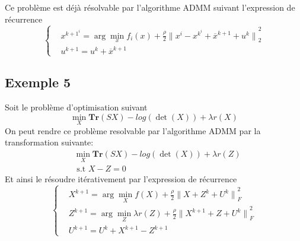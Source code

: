 \documentclass[12pt,a4paper]{report}
\begin{document}
            	Ce problème est déjà résolvable par l'algorithme ADMM suivant l'expression de récurrence
            	\begin{equation*}
                	\left\{  
                    	\begin{aligned}
                        	& x^{k+1}^i = \arg\min_{x} f_i(x) + \frac{\rho}{2}{\| x^i - x^k^i + \overline{x}^{k+1} + u^k\|}^2_2 \\
                        	& u^{k+1} = u^{k} + \overline{x}^{k+1}
                    	\end{aligned}
                	\right.
            	\end{equation*}
           	 
        	\subsection*{Exemple 5}
            	Soit le problème d'optimisation suivant
            	\begin{equation*}
                	\min_{X} \textbf{Tr}(SX) - log(\det(X)) + \lambda r(X)
            	\end{equation*}
            	On peut rendre ce problème resolvable par l'algorithme ADMM par la transformation suivante:
            	\begin{equation*}
                	\begin{aligned}
                    	& \min_{X} \textbf{Tr}(SX) - log(\det(X)) + \lambda r(Z) \\
                    	& \text{ s.t  $X - Z = 0$ }
                	\end{aligned}
            	\end{equation*}
            	Et ainsi le résoudre itérativement par l'expression de récurrence
            	\begin{equation*}
                	\left\{  
                    	\begin{aligned}
                        	& X^{k+1} = \arg\min_{X} f(X) + \frac{\rho}{2}{\| X + Z^k + U^k\|}^2_F \\
                        	& Z^{k+1} = \arg\min_{Z} \lambda r(Z) + \frac{\rho}{2}{\| X^{k+1} + Z + U^k\|}^2_F \\
                        	& U^{k+1} = U^{k} + X^{k+1}-Z^{k+1}
                    	\end{aligned}
                	\right.
            	\end{equation*}
           	 
\end{document}
